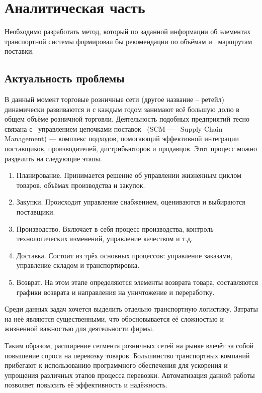 \section{Аналитическая часть}
Необходимо разработать метод, который по заданной информации об элементах транспортной системы формировал бы рекомендации по объёмам и \, маршрутам поставки.

\subsection{Актуальность проблемы}
	В данный момент торговые розничные сети (другое название -- ретейл) динамически развиваются и с каждым годом занимают всё большую долю в общем объёме розничной торговли\cite{subj:demand}. Деятельность подобных предприятий тесно связана с \, управлением цепочками поставок \, (SCM --- \, Supply Chain Management) --- комплекс подходов, помогающий эффективной интеграции поставщиков, производителей, дистрибьюторов
	и продавцов. Этот процесс можно разделить на следующие этапы\cite{subj:scm}. 
	\begin{enumerate}
		\item Планирование. Принимается решение об управлении жизненным циклом товаров, объёмах производства и закупок.
		\item Закупки. Происходит управление снабжением, оцениваются и выбираются поставщики.
		\item Производство. Включает в себя процесс производства, контроль технологических изменений, управление качеством и т.д.
		\item Доставка. Состоит из трёх основных процессов: управление заказами, управление складом и транспортировка.
		\item Возврат. На этом этапе определяются элементы возврата товара, составляются графики возврата и направления на уничтожение и переработку.
	\end{enumerate}
	
	Среди данных задач хочется выделить отдельно транспортную логистику. Затраты на неё являются существенными, что обосновывается её сложностью и жизненной важностью для деятельности фирмы. 
	
	Таким образом, расширение сегмента розничных сетей на рынке влечёт за собой повышение спроса на перевозку товаров. Большинство транспортных компаний прибегают к использованию программного обеспечения для ускорения и упрощения различных этапов процесса перевозки\cite{subj:auto_eff}.  Автоматизация данной работы позволяет повысить её эффективность и надёжность.


